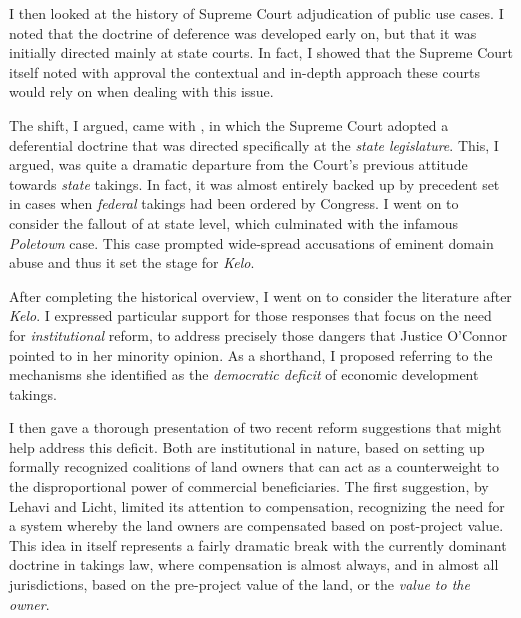 \documentclass[12pt,a4paper]{book} %
\begin{document}
I then looked at the history of Supreme Court adjudication of public use cases. I noted that the doctrine of deference was developed early on, but that it was initially directed mainly at state courts. In fact, I showed that the Supreme Court itself noted with approval the contextual and in-depth approach these courts would rely on when dealing with this issue.

The shift, I argued, came with \textcite{berman54}, in which the Supreme Court adopted a deferential doctrine that was directed specifically at the {\it state legislature}. This, I argued, was quite a dramatic departure from the Court's previous attitude towards {\it state} takings. In fact, it was almost entirely backed up by precedent set in cases when {\it federal} takings had been ordered by Congress. I went on to consider the fallout of \textcite{berman84} at state level, which culminated with the infamous {\it Poletown} case. This case prompted wide-spread accusations of eminent domain abuse and thus it set the stage for {\it Kelo}.

After completing the historical overview, I went on to consider the literature after {\it Kelo}. I expressed particular support for those responses that focus on the need for {\it institutional} reform, to address precisely those dangers that Justice O'Connor pointed to in her minority opinion. As a shorthand, I proposed referring to the mechanisms she identified as the {\it democratic deficit} of economic development takings. 

I then gave a thorough presentation of two recent reform suggestions that might help address this deficit. Both are institutional in nature, based on setting up formally recognized coalitions of land owners that can act as a counterweight to the disproportional power of commercial beneficiaries. The first suggestion, by Lehavi and Licht, limited its attention to compensation, recognizing the need for a system whereby the land owners are compensated based on post-project value.  This idea in itself represents a fairly dramatic break with the currently dominant doctrine in takings law, where compensation is almost always, and in almost all jurisdictions, based on the pre-project value of the land, or the {\it value to the owner}.
\end{document}
